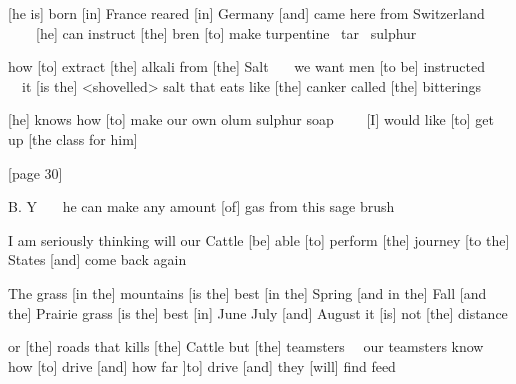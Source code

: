 					[he is] born [in] France reared [in] Germany [and] came here from Switzerland \ \ \ \ [he] can instruct [the] bren [to] make turpentine \ tar \ sulphur

					how [to] extract [the] alkali from [the] Salt \ \ \ we want men [to be] instructed \ \ it [is the] <shovelled> salt that eats like [the] canker called [the] bitterings 

					[he] knows how [to] make our own olum sulphur soap \ \ \ \ [I] would like [to] get up [the class for him]

					[page 30]

					B. Y \ \ \ he can make any amount [of] gas from this sage brush

					I am seriously thinking will our Cattle [be] able [to] perform [the] journey [to the] States [and] come back again

					The grass [in the] mountains [is the] best [in the] Spring [and in the] Fall [and the] Prairie grass [is the] best [in] June July [and] August   it [is] not [the] distance

					or [the] roads that kills [the] Cattle but [the] teamsters \ \ our teamsters know how [to] drive [and] how far ]to] drive [and] they [will] find feed